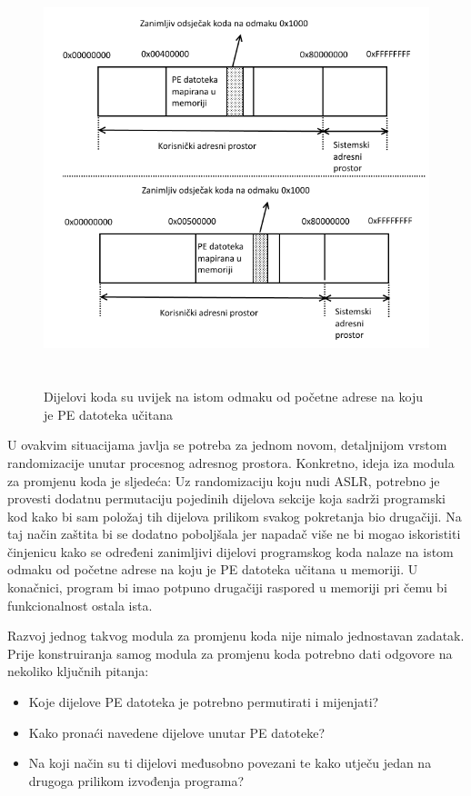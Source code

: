 \documentclass[times, utf8, diplomski, numeric]{fer}
\begin{document}
\begin{figure}[!htb]
\centering
\setlength\fboxsep{0pt}
\setlength\fboxrule{0.5pt}
\includegraphics[width=12cm, height=12cm]{slike/aslr_permutacija}
\caption{Dijelovi koda su uvijek na istom odmaku od početne adrese na koju je PE datoteka učitana}
\label{fig:aslr_permutacija} 
\end{figure}

U ovakvim situacijama javlja se potreba za jednom novom,
detaljnijom vrstom randomizacije unutar procesnog adresnog
prostora. Konkretno, ideja iza modula za promjenu koda je
sljedeća: Uz randomizaciju koju nudi ASLR, potrebno je provesti
dodatnu permutaciju pojedinih dijelova sekcije koja sadrži
programski kod kako bi sam položaj tih dijelova prilikom svakog
pokretanja bio drugačiji. Na taj način zaštita bi se dodatno
poboljšala jer napadač više ne bi mogao iskoristiti činjenicu
kako se određeni zanimljivi dijelovi programskog koda nalaze na			%
istom odmaku od početne adrese na koju je PE datoteka učitana u
memoriji. U konačnici, program bi imao potpuno drugačiji raspored
u memoriji pri čemu bi funkcionalnost ostala ista.

Razvoj jednog takvog modula za promjenu koda nije nimalo
jednostavan zadatak. Prije konstruiranja samog modula za promjenu
koda potrebno dati odgovore na nekoliko ključnih pitanja:

\begin{itemize}
\item Koje dijelove PE datoteka je potrebno permutirati i mijenjati?
\item Kako pronaći navedene dijelove unutar PE datoteke?
\item Na koji način su ti dijelovi međusobno povezani te kako utječu jedan na drugoga prilikom izvođenja programa?
\end{itemize}
\end{document}
